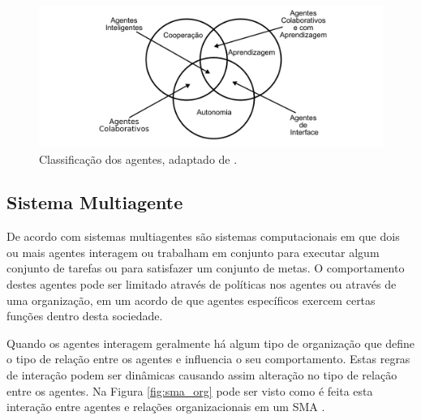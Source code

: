 \begin{figure}[ht]
\centering
\includegraphics[scale=0.7]{imagens/tipos_agentes.pdf}
\caption{Classificação dos agentes, adaptado de \cite{nwana1996software}.}
\label{fig:class_agente}
\end{figure}





\subsection{Sistema Multiagente}

De acordo com \cite{lesser1999cooperative} sistemas multiagentes são sistemas computacionais em que dois ou mais agentes interagem ou trabalham em conjunto para executar algum conjunto de tarefas ou para satisfazer um conjunto de metas. O comportamento destes agentes pode ser limitado através de políticas nos agentes ou através de uma organização, em um acordo de que agentes específicos exercem certas funções dentro desta sociedade.

Quando os agentes interagem geralmente há algum tipo de organização que define o tipo de relação entre os agentes e influencia o seu comportamento. Estas regras de interação podem ser dinâmicas causando assim alteração no tipo de relação entre os agentes. Na Figura \ref{fig:sma_org} pode ser visto como é feita esta interação entre agentes e relações organizacionais em um SMA \cite{jennings2000agent}.

